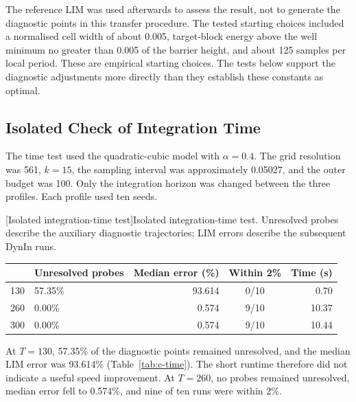 The reference LIM was used afterwards to assess the result, not to generate the diagnostic points in this transfer procedure. The tested starting choices included a normalised cell width of about 0.005, target-block energy above the well minimum no greater than 0.005 of the barrier height, and about 125 samples per local period. These are empirical starting choices. The tests below support the diagnostic adjustments more directly than they establish these constants as optimal.

\par\noindent\begin{minipage}{\linewidth}
\vspace*{1.5ex}
\subsection{Isolated Check of Integration Time}

The time test used the quadratic-cubic model with $\alpha=0.4$. The grid resolution was 561, $k=15$, the sampling interval was approximately 0.05027, and the outer budget was 100. Only the integration horizon was changed between the three profiles. Each profile used ten seeds.

\begin{center}
\centering\small
{}[Isolated integration-time test]{Isolated integration-time test. Unresolved probes describe the auxiliary diagnostic trajectories; LIM errors describe the subsequent DynIn runs.}
\label{tab:c-time}
\begin{tabularx}{\linewidth}{@{}c Y r c r@{}}
\toprule
{} & Unresolved probes & Median error (\%) & Within 2\% & Time (s) \\
 & 57.35\% & 93.614 & 0/10 & 0.70 \\
260 & 0.00\% & 0.574 & 9/10 & 10.37 \\
300 & 0.00\% & 0.574 & 9/10 & 10.44 \\
\bottomrule
\end{tabularx}
\end{center}
\end{minipage}\par\medskip

At $T=130$, 57.35\% of the diagnostic points remained unresolved, and the median LIM error was 93.614\% (Table~\ref{tab:c-time}). The short runtime therefore did not indicate a useful speed improvement. At $T=260$, no probes remained unresolved, median error fell to 0.574\%, and nine of ten runs were within 2\%.

